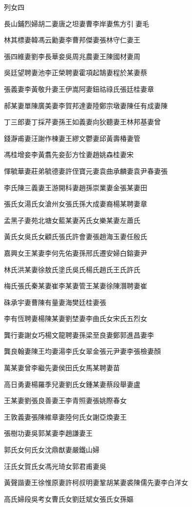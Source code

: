 
\begin{pinyinscope}
列女四

長山鋪烈婦胡二妻唐之坦妻曹李岸妻焦方引妻毛

林其標妻韓馮云勷妻李曹邦傑妻張林守仁妻王

張四維妻劉李長華妾吳周兆農妻王陳國材妻周

吳廷望聘妻池李正榮聘妻霍項起鵠妻程於某妻蔡

張義妻李黃敬升妻王伊嵩阿妻鈕祜祿氏張廷桂妻章

郝某妻單陳廣美妻李賀邦達妻陸鄭宗墩妻陳任有成妻陳

丁三郎妻丁採芹妻孫王如義妻向狄聽妻王林邦基妻曾

錢瀞甫妻汪謝作棟妻王繆文鬱妻邱黃壽椿妻管

馮桂增妾李黃翥先妾彭方恮妻趙姚森桂妻宋

惲毓華妻莊弟毓德妻許侄寶元妻袁曲承麟妻袁尹春妻張

李氏陳三義妻王游開科妻趙孫崇業妻金張某妻田

張氏女湯氏女滄州女張氏孫大成妻裔楊某聘妻章

孟黑子妻苑北塘女藍某妻芮氏女樂某妻左蕭氏

黃氏女吳氏女顧氏張氏許會妻張趙海玉妻任殷氏

嘉興女王某妻李何先佑妻孫邢氏遷安婦白鎔妻尹

林氏洪某妻徐敖氏塗氏吳氏楊氏趙氏王氏許氏

梅氏張氏秦某妻崔李某妻管王某妻徐陳潛聘妻崔

硃承宇妻曹陳有量妻海樊廷桂妻張

李有恆聘妻楊陳某妻劉埜妻李曲氏女宋氏五烈女

龔行妻謝女巧楊文龍聘妻孫梁至良妻鄭郭進昌妻李

龔良翰妻陳王均妻湯李氏女翠金張元尹妻李張檢妻顏

萬某妻曾李繼先妻侯田氏女馬某聘妻苗

高日勇妻楊羅季兒妻劉氏女鍾某妻蔡段舉妻盧

王某妻劉張良善妻王李青照妻張姚際春女

王敦義妻張陳維章妻陸何氏女謝亞煥妻王

張樹功妻吳郭某妻李趙謙妻王

郭氏女何氏女沈鼎猷妻嚴鐵山婦

汪氏女賀氏女馮光琦女郭君甫妻吳

黃聲諧妻王徐惟原妻許柯叔明妻鞏胡某妻裘陳儒先妻李白洋女

高氏婦段吳考女曹氏女劉廷斌女張氏女孫嫗


\end{pinyinscope}
